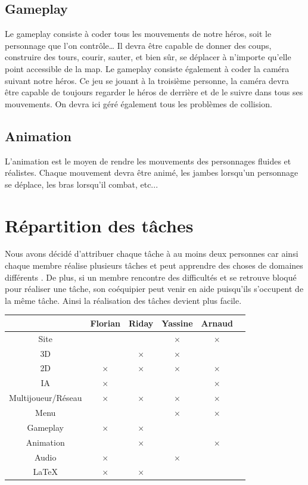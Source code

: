 \documentclass[a4paper, 12pt]{article}
\begin{document}
	\subsection{Gameplay}
	Le gameplay consiste à coder tous les mouvements de notre héros, soit le personnage que l’on contrôle… Il devra être capable de donner des coups, construire des tours, courir, sauter, et bien sûr, se déplacer à n’importe qu’elle point accessible de la map. Le gameplay consiste également à coder la caméra suivant notre héros. Ce jeu se jouant à la troisième personne, la caméra devra être capable de toujours regarder le héros de derrière et de le suivre dans tous ses mouvements. On devra ici géré également tous les problèmes de collision.
	\subsection{Animation}
	L’animation est le moyen de rendre les mouvements des personnages fluides et réalistes. Chaque mouvement devra être animé, les jambes lorsqu’un personnage se déplace, les bras lorsqu’il combat, etc...



\section{Répartition des tâches}
Nous avons décidé d’attribuer chaque tâche à au moins deux personnes car ainsi chaque membre réalise plusieurs tâches et peut apprendre des choses de domaines différents . De plus, si un membre rencontre des difficultés et se retrouve bloqué pour réaliser une tâche, son coéquipier peut venir en aide puisqu’ils s’occupent de la même tâche. Ainsi la réalisation des tâches devient plus facile.
\bigbreak
\bigbreak
	\begin{tabular}{|c||c|c|c|c|c|}
		\hline
		& Florian & Riday & Yassine & Arnaud \\
		\hline
		Site & & & $\times$ & $\times$\\
		\hline
		3D & & $\times$ & $\times$ &\\
		\hline
		2D & $\times$ & $\times$ & $\times$ & $\times$ \\
		\hline
		IA & $\times$ & & & $\times$\\
		\hline
		Multijoueur/Réseau & $\times$ & $\times$ & $\times$ & $\times$\\
		\hline
		Menu & & & $\times$ & $\times$\\
		\hline
		Gameplay & $\times$ & $\times$ & &\\
		\hline
		Animation & & $\times$ & & $\times$\\		
		\hline
		Audio & $\times$ & & $\times$ &\\
		\hline
		\LaTeX & $\times$ & $\times$ & &\\
		\hline
	\end{tabular}
	\newpage
\end{document}
